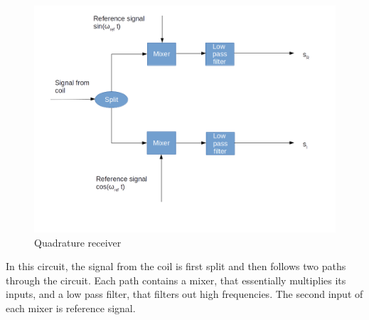 \documentclass[a4paper, draft]{article}
\theoremstyle{own}
\theoremstyle{remark}
\begin{document}
\begin{figure}[ht]
\centering
\includegraphics[width=0.9\linewidth]{images/MeasurementCircuit}
\caption[Quadrature receiver]{Quadrature receiver}
\label{fig:MeasurementCircuit}
\end{figure}

In this circuit, the signal from the coil is first split and then follows two paths through the circuit. Each path contains a mixer, that essentially multiplies its inputs, and a low pass filter, that filters out high frequencies. The second input of each mixer is reference signal.
\end{document}
